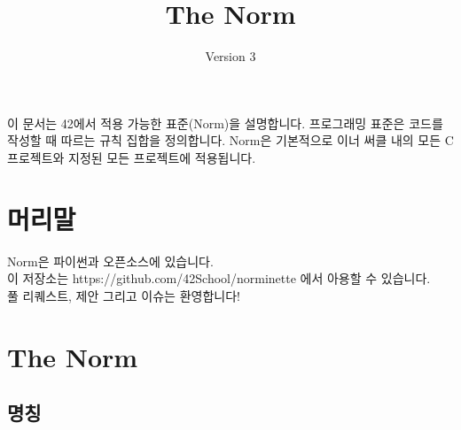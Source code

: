\documentclass{42-ko}
\begin{document}
\title{The Norm}
\subtitle{Version 3}

\summary
{
    이 문서는 42에서 적용 가능한 표준(Norm)을 설명합니다. 프로그래밍 표준은 
    코드를 작성할 때 따르는 규칙 집합을 정의합니다. Norm은 기본적으로 이너 써클 
    내의 모든 C 프로젝트와 지정된 모든 프로젝트에 적용됩니다.
}

\maketitle

\tableofcontents



\chapter{머리말}

    Norm은 파이썬과 오픈소스에 있습니다. \\
    이 저장소는 https://github.com/42School/norminette 에서 아용할 수 있습니다.\\
    풀 리퀘스트, 제안 그리고 이슈는 환영합니다!

\chapter{The Norm}


    \section{명칭}
\end{document}
